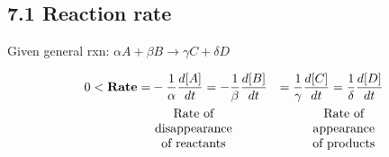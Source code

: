 \subsection{7.1 Reaction rate}
    \vspace*{1em}
    \centerline{Given general rxn: $\alpha A + \beta B \longrightarrow \gamma C + \delta D$}
    \begin{align*}
        0 < \text{\textbf{Rate}} =& -\frac{1}{\alpha} \frac{d[A]}{d t} = -\frac{1}{\beta} \frac{d[B]}{d t} &= \frac{1}{\gamma} \frac{d[C]}{d t} = \frac{1}{\delta} \frac{d[D]}{d t} \\ 
        &\parbox[t]{2.4cm}{\centering Rate of disappearance\\of reactants} &\parbox[t]{2.2cm}{\centering Rate of appearance\\of products}
    \end{align*}
